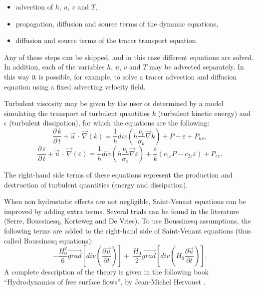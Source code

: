 \begin{itemize}
\item advection of $h$, $u$, $v$ and $T$,

\item propagation, diffusion and source terms of the dynamic equations,

\item diffusion and source terms of the tracer transport equation.
\end{itemize}

Any of these steps can be skipped, and in this case different equations are
solved.
In addition, each of the variables $h$, $u$, $v$ and $T$ may be advected
separately.
In this way it is possible, for example, to solve a tracer advection
and diffusion equation using a fixed advecting velocity field.

Turbulent viscosity may be given by the user or determined by a model simulating
the transport of turbulent quantities $k$ (turbulent kinetic energy) and
$\epsilon$ (turbulent dissipation), for which the equations are the following:
\[\frac{\partial \, k}{\partial \, t} +\vec{u}\, \cdot \, \vec{\nabla }(k)=\frac{1}{h} div(h\frac{\nu _{t} }{\sigma _{k} } \vec{\nabla }k)+P-\varepsilon +P_{kv}, \]
\[\frac{\partial \, \varepsilon }{\partial \, t} +\vec{u}\, \cdot \, \vec{\nabla }(\varepsilon )=\frac{1}{h} div(h\frac{\nu _{t} }{\sigma _{\varepsilon } } \vec{\nabla }\varepsilon )+\frac{\varepsilon }{k} (c_{1\varepsilon } P-c_{2\varepsilon } \varepsilon )+P_{\varepsilon v}. \]


The right-hand side terms of these equations represent the production and
destruction of turbulent quantities (energy and dissipation).

When non hydrostatic effects are not negligible, Saint-Venant equations can be
improved by adding extra terms.
Several trials can be found in the literature (Serre, Boussinesq, Korteweg
and De Vries).
To use Boussinesq assumptions, the following terms are added to the right-hand
side of Saint-Venant equations (thus called Boussinesq equations):
\[-\frac{H^2_0}{6}\overrightarrow{grad}\left[div\left(\frac{\partial \overrightarrow{u}}{\partial t}\right)\right]+\ \frac{H_0}{2}\overrightarrow{grad}\left[div\left(H_0\frac{\partial \overrightarrow{u}}{\partial t}\right)\right].\]
A complete description of the theory is given in the following book
``Hydrodynamics of free surface flows'', by Jean-Michel Hervouet
\cite{Hervouet2007}.
